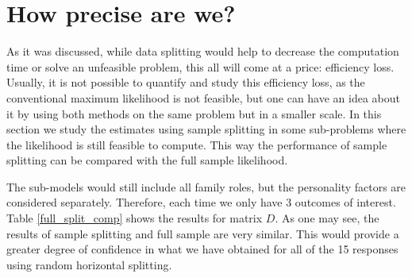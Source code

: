 \documentclass[11pt,a5paper,twoside]{book}
\begin{document}
\section{How precise are we?}
\label{how_good_sec}

As it was discussed, while data splitting would help to decrease the computation time or solve an unfeasible problem, this all will come at a price: efficiency loss. Usually, it is not possible to quantify and study this efficiency loss, as the conventional maximum likelihood is not feasible, but one can have an idea about it by using both methods on the same problem but in a smaller scale. In this section we study the estimates using sample splitting in some sub-problems where the likelihood is still feasible to compute. This way the performance of sample splitting can be compared with the full sample likelihood. 

The sub-models would still include all family roles, but the personality factors are considered separately. Therefore, each time we only have 3 outcomes of interest. Table \ref{full_split_comp} shows the results for matrix $D$. As one may see, the results of sample splitting and full sample are very similar. This would provide a greater degree of confidence in what we have obtained for all of the 15 responses using random horizontal splitting.
\end{document}
